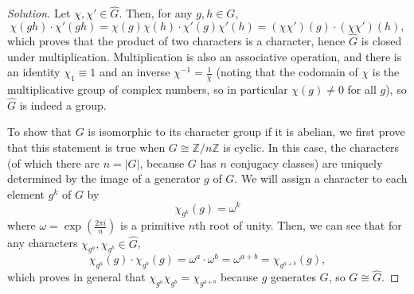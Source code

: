 \documentclass[10pt]{scrartcl}
\providecommand{\ZZ}{\mathbb Z}
\providecommand{\inv}{^{-1}}
\newenvironment{soln}{\begin{proof}[Solution]}{\end{proof}}
\begin{document}
\begin{soln}
	Let $\chi,\chi'\in\widehat G$. Then, for any $g,h\in G$,
	\[\chi(gh)\cdot \chi'(gh) = \chi(g)\chi(h)\cdot\chi'(g)\chi'(h)
	= (\chi\chi')(g)\cdot (\chi\chi')(h),\]
	which proves that the product of two characters is a character,
	hence $\widehat G$ is closed under multiplication.
	Multiplication is also an associative operation,
	and there is an identity $\chi_1\equiv 1$ and an inverse
	$\chi\inv = \frac{1}{\chi}$ (noting that the codomain of $\chi$
	is the multiplicative group of complex numbers, so in particular
	$\chi(g)\ne 0$ for all $g$), so $\widehat G$ is indeed a group.
	
	To show that $G$ is isomorphic to its character group if it is abelian,
	we first prove that this statement is true when $G\cong\ZZ/n\ZZ$
	is cyclic. In this case, the characters (of which there are $n = |G|$,
	because $G$ has $n$ conjugacy classes) are uniquely determined by
	the image of a generator $g$ of $G$. We will assign a character to
	each element $g^k$ of $G$ by
	\[\chi_{g^k}(g) = \omega^k\]
	where $\omega = \exp(\frac{2\pi i}n)$ is a primitive $n$th root of unity.
	Then, we can see that for any characters
	$\chi_{g^a},\chi_{g^b}\in\widehat G$,
	\[\chi_{g^a}(g)\cdot \chi_{g^b}(g) =
	\omega^a\cdot\omega^b = \omega^{a+b} = \chi_{g^{a+b}}(g),\]
	which proves in general that $\chi_{g^a}\chi_{g^b} = \chi_{g^{a+b}}$
	because $g$ generates $G$, so $G\cong\widehat G$.
	

\end{soln}
\end{document}
